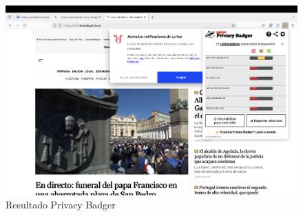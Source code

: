 \begin{figure}[H]   
    \includegraphics[width=\textwidth]{resultado_privacybadger.png}
    \caption{Resultado Privacy Badger}
    \label{fig:resultado_privacybadger}
\end{figure}
